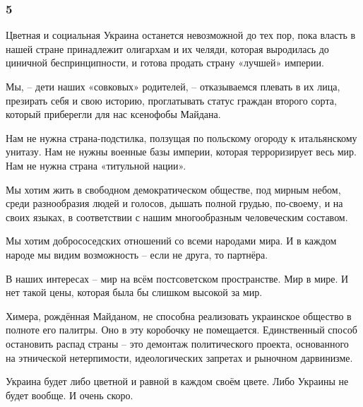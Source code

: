  
 
 
 
 

\subsubsection{5}

Цветная и социальная Украина останется невозможной до тех пор, пока власть в
нашей стране принадлежит олигархам и их челяди, которая выродилась до циничной
беспринципности, и готова продать страну «лучшей» империи.

Мы, – дети наших «совковых» родителей, – отказываемся плевать в их лица,
презирать себя и свою историю, проглатывать статус граждан второго сорта,
который приберегли для нас ксенофобы Майдана.

Нам не нужна страна-подстилка, ползущая по польскому огороду к итальянскому
унитазу. Нам не нужны военные базы империи, которая терроризирует весь мир. Нам
не нужна страна «титульной нации».

Мы хотим жить в свободном демократическом обществе, под мирным небом, среди
разнообразия людей и голосов, дышать полной грудью, по-своему, и на своих
языках, в соответствии с нашим многообразным человеческим составом.

Мы хотим добрососедских отношений со всеми народами мира. И в каждом народе мы
видим возможность – если не друга, то партнёра. 

В наших интересах – мир на всём постсоветском пространстве. Мир в мире. И нет
такой цены, которая была бы слишком высокой за мир.

Химера, рождённая Майданом, не способна реализовать украинское общество в
полноте его палитры. Оно в эту коробочку не помещается. Единственный способ
остановить распад страны – это демонтаж политического проекта, основанного на
этнической нетерпимости, идеологических запретах и рыночном дарвинизме.  

Украина будет либо цветной и равной в каждом своём цвете. Либо Украины не будет
вообще. И очень скоро.


